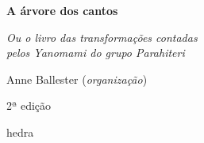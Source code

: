 




\begingroup\thispagestyle{empty}\vspace*{.05\textheight} 

              \formular
              \huge
              \noindent
              \textbf{A árvore dos cantos}

              \bigskip  
              
              \normalsize
              \noindent
              \textit{Ou o livro das transformações contadas\\pelos Yanomami do grupo Parahiteri}
              \vspace{11.8em}
              
              \newfontfamily{}
              {\selectfont\garamond\small\noindent Anne Ballester (\textit{organização})}

              \bigskip

              \noindent
              {\selectfont\garamond\small\noindent 2ª edição}

              \vfill

              \newfontfamily{}
              {\noindent\fontsize{30}{40}\selectfont \timesnewroman hedra}


\endgroup
\pagebreak
